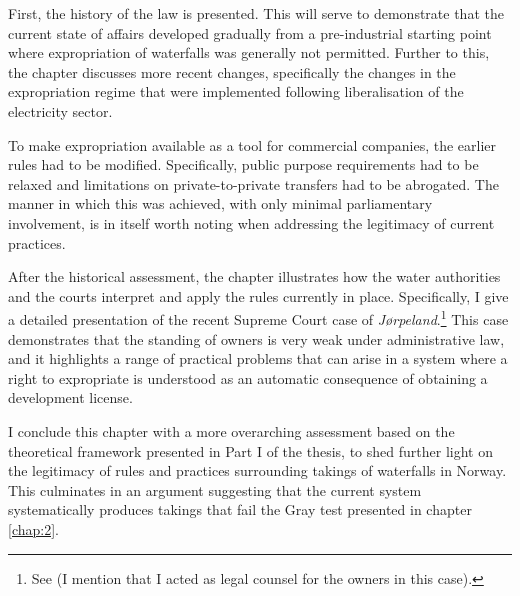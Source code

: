 First, the history of the law is presented. This will serve to demonstrate that the current state of affairs developed gradually from a pre-industrial starting point where expropriation of waterfalls was generally not permitted. Further to this, the chapter discusses more recent changes, specifically the changes in the expropriation regime that were implemented following liberalisation of the electricity sector.

To make expropriation available as a tool for commercial companies, the earlier rules had to be modified. Specifically, public purpose requirements had to be relaxed and limitations on private-to-private transfers had to be abrogated. The manner in which this was achieved, with only minimal parliamentary involvement, is in itself worth noting when addressing the legitimacy of current practices.

After the historical assessment, the chapter illustrates how the water authorities and the courts interpret and apply the rules currently in place. Specifically, I give a detailed presentation of the recent Supreme Court case of {\it Jørpeland}.\footnote{See \cite{jorpeland11} (I mention that I acted as legal counsel for the owners in this case).} This case demonstrates that the standing of owners is very weak under administrative law, and it highlights a range of practical problems that can arise in a system where a right to expropriate is understood as an automatic consequence of obtaining a development license.


I conclude this chapter with a more overarching assessment based on the theoretical framework presented in Part I of the thesis, to shed further light on the legitimacy of rules and practices surrounding takings of waterfalls in Norway. This culminates in an argument suggesting that the current system systematically produces takings that fail the Gray test presented in chapter \ref{chap:2}. %

